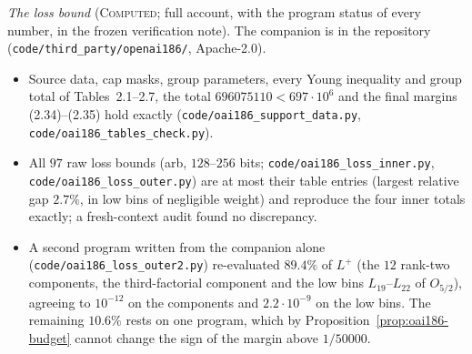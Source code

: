 \documentclass[11pt]{amsart}
\theoremstyle{definition}
\theoremstyle{remark}
\newcommand{\lbl}[1]{\textup{\textsc{#1}}}
\begin{document}
\begin{sloppypar}\noindent\emph{The loss bound} (\lbl{Computed}; full account, with the program status of
every number, in the frozen verification note). The companion is in the
repository (\texttt{code/third\_party/openai186/}, Apache-2.0).
\begin{itemize}
\item Source data, cap masks, group parameters, every Young inequality and
  group total of Tables~2.1--2.7, the total $696075110<697\cdot10^6$ and the
  final margins (2.34)--(2.35) hold exactly
  (\texttt{code/oai186\_support\_data.py}, \texttt{code/oai186\_tables\_check.py}).
\item All $97$ raw loss bounds (arb, $128$--$256$ bits;
  \texttt{code/}\allowbreak\texttt{oai186\_loss\_inner.py},
  \texttt{code/}\allowbreak\texttt{oai186\_loss\_outer.py}) are
  at most their table entries (largest relative gap $2.7\%$, in low bins of
  negligible weight) and reproduce the four inner totals exactly; a
  fresh-context audit found no discrepancy.
\item A second program written from the companion alone
  (\texttt{code/oai186\_loss\_outer2.py}) re-evaluated $89.4\%$ of $L^+$ (the
  $12$ rank-two components, the third-factorial component and the low bins
  $L_{19}$--$L_{22}$ of $O_{5/2}$), agreeing to $10^{-12}$ on the components and
  $2.2\cdot10^{-9}$ on the low bins. The remaining $10.6\%$ rests on one program,
  which by Proposition~\ref{prop:oai186-budget} cannot change the sign of the
  margin above $1/50000$.
\end{itemize}
\end{sloppypar}
\end{document}
